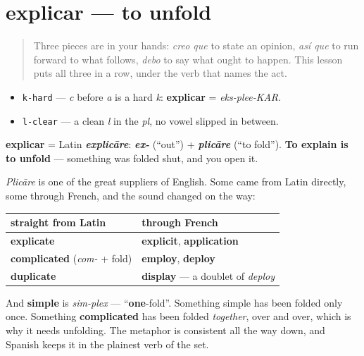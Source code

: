 \section[explicar]{explicar — to unfold}

\label{lesson:ES-C39-explicar}



\begin{quote}
Three pieces are in your hands: \emph{creo que} to state an opinion, \emph{así que} to run forward to what follows, \emph{debo} to say what ought to happen. This lesson puts all three in a row, under the verb that names the act.
\end{quote}

\begin{sounds}
\begin{itemize}
\raggedright
  \item \texttt{k-hard} — \emph{c} before \emph{a} is a hard \emph{k}: \textbf{explicar} = \emph{eks-plee-KAR}.
  \item \texttt{l-clear} — a clean \emph{l} in the \emph{pl}, no vowel slipped in between.
\end{itemize}
\end{sounds}

\begin{cousinweb}
\textbf{explicar} = Latin \emph{\textbf{explicāre}}: \emph{\textbf{ex-}} (\textquotedblleft{}out\textquotedblright{}) + \emph{\textbf{plicāre}} (\textquotedblleft{}to fold\textquotedblright{}). \textbf{To explain is to unfold} — something was folded shut, and you open it.

\emph{Plicāre} is one of the great suppliers of English. Some came from Latin directly, some through French, and the sound changed on the way:

\noindent
\begin{tabularx}{\linewidth}{@{}>{\raggedright\arraybackslash}X>{\raggedright\arraybackslash}X@{}}
\toprule
\textbf{straight from Latin} & \textbf{through French} \\
\midrule
\textbf{explicate} & \textbf{explicit}, \textbf{application} \\
\textbf{complicated} (\emph{com-} + fold) & \textbf{employ}, \textbf{deploy} \\
\textbf{duplicate} & \textbf{display} — a doublet of \emph{deploy} \\
\bottomrule
\end{tabularx}

And \textbf{simple} is \emph{sim-plex} — \textquotedblleft{}\textbf{one}-fold\textquotedblright{}. Something simple has been folded only once. Something \textbf{complicated} has been folded \emph{together}, over and over, which is why it needs unfolding. The metaphor is consistent all the way down, and Spanish keeps it in the plainest verb of the set.
\end{cousinweb}

